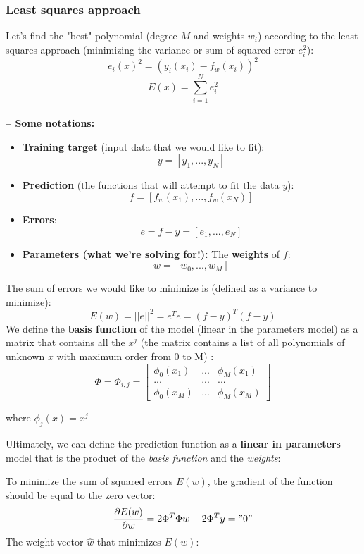 \documentclass[a4paper,11pt]{article}
\begin{document}
	\subsubsection{Least squares approach}
	Let's find the "best" polynomial (degree $M$ and weights $w_i$) according to the least squares approach (minimizing the variance or sum of squared error $e_i^2$):
	\[e_i(x)^2=(y_i(x_i)-f_w(x_i))^2\]
	\[E(x)=\sum^N_{i=1} e_i^2\]
	\vspace{5pt}\\
	\underline{\textbf{-- Some notations:}}
	\begin{itemize}
		\item \textbf{Training target} (input data that we would like to fit):
		\[  y = [y_1,...,y_N]  \]
		\item \textbf{Prediction} (the functions that will attempt to fit the data $y$):
		\[  f = [f_w(x_1),...,f_w(x_N)]  \]
		\item \textbf{Errors}:
		\[  e = f-y = [e_1,...,e_N]  \]
		\item \textbf{Parameters (what we're solving for!):} The \textbf{weights} of $f$:
		\[ w = [w_0,...,w_M]  \]
	\end{itemize}
	The sum of errors we would like to minimize is (defined as a variance to minimize):
	\[ E(w) = ||e||^2 = e^Te= (f-y)^T(f-y)\]	
	We define the \textbf{basis function} of the model (linear in the parameters model) as a matrix that contains all the $x^j$ (the matrix contains a list of all polynomials of unknown $x$ with maximum order from 0 to M) :
	\[ \Phi = \Phi_{i,j} =  \begin{bmatrix}
		\phi_0(x_1) & ... & \phi_M(x_1)\\
		... & ... & ...\\
		\phi_0(x_M) & ... & \phi_M(x_M)
	\end{bmatrix}
	\]
	\begin{center}
		where $\phi_j(x) = x^j $
	\end{center}
Ultimately, we can define the prediction function as a \textbf{linear in parameters} model that is the product of the \emph{basis function} and the \emph{weights}:
\begin{center}
\end{center}
To minimize the sum of squared errors $E(w)$, the gradient of the function should be equal to the zero vector:
\[  \frac{\partial E(w)}{\partial w} = 2 \Phi^T \Phi w - 2 \Phi^Ty = "0" \]
The weight vector $\hat{w}$ that minimizes $E(w)$:
\begin{center}
\end{center}
\end{document}
